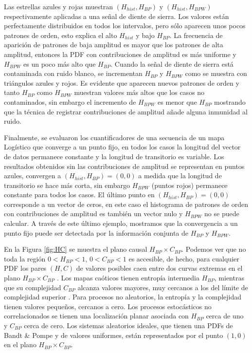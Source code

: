 Las estrellas azules y rojas muestran $(H_{hist}, H_{BP})$ y $ (H_{hist}, H_{BPW})$ respectivamente aplicadas a una señal de diente de sierra.
Los valores están perfectamente distribuidos en todos los intervalos, pero sólo aparecen unos pocos patrones de orden, esto explica el alto $H_{hist}$ y bajo $H_{BP}$.
La frecuencia de aparición de patrones de baja amplitud es mayor que los patrones de alta amplitud, entonces la PDF con contribuciones de amplitud es más uniforme y $H_{BPW}$ es un poco más alto que $H_{BP}$.
Cuando la señal de diente de sierra está contaminada con ruido blanco, se incrementan $H_ {BP}$ y $H_ {BPW}$ como se muestra con triángulos azules y rojos.
Es evidente que aparecen nuevos patrones de orden y tanto $H_{BP}$ como $H_{BPW}$ muestran valores más altos que los casos no contaminados, sin embargo el incremento de $H_{BPW}$ es menor que $H_{BP}$ mostrando que la técnica de registrar contribuciones de amplitud añade alguna inmunidad al ruido.

Finalmente, se evaluaron los cuantificadores de una secuencia de un mapa Logístico que converge a un punto fijo, en todos los casos la longitud del vector de datos permanece constante y la longitud de transitorio es variable.
Los resultados obtenidos sin las contribuciones de amplitud se representan en puntos azules, convergen a $(H_{hist}, H_{BP}) = (0, 0)$ a medida que la longitud de transitorio se hace más corta, sin embargo $H_{BPW}$ (puntos rojos) permanece constante para todos los casos.
El último punto en $(H_{hist}, H_{BP}) = (0, 0)$ corresponde a un vector de ceros, en este caso el histograma de patrones de orden con contribuciones de amplitud es también un vector nulo y $H_{BPW}$ no se puede calcular.
A través de este último ejemplo, mostramos que la convergencia a un punto fijo puede ser detectada por la información conjunta de $H_{BP}$ y $H_{BPW}$.

En la Figura \ref{fig:HC} se muestra el plano causal $H_{BP} \times C_{BP}$.
Podemos ver que no toda la región $0 < H_{BP} < 1$, $0 < C_{BP} < 1$ es accesible, de hecho, para cualquier PDF los pares $(H, C)$ de valores posibles caen entre dos curvas extremas en el plano $H_{BP} \times C_{BP}$ \cite{Anteneodo1996}.
Los mapas caóticos tienen entropía intermedia $H_{BP}$, mientras que su complejidad $C_{BP}$ alcanza valores mayores, muy cercanos a los del límite de complejidad superior \cite{Rosso2007, Olivares2012}.
Para procesos no aleatorios, la entropía y la complejidad tienen valores pequeños, cercanos a cero.
Los procesos estocásticos no correlacionados se tienen una localización planar asociada con $H_{BP}$ cerca de uno y $C_{BP}$ cerca de cero.
Los sistemas aleatorios ideales, que tienen una PDFs de Bandt \& Pompe y de valores uniformes, están representados por el punto $(1,0)$ \cite{Gonzalez2005} en el plano $H_{BP} \times C_{BP}$.

